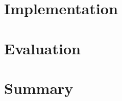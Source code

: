 \documentclass[conference]{acmsiggraph}
\begin{document}
\section{Implementation}

\section{Evaluation}
\section{Summary}






\end{document}

